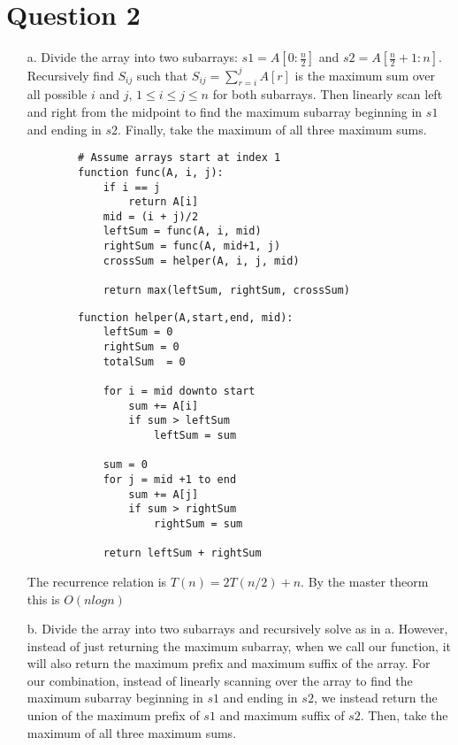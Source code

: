 \documentclass[12pt]{article}
\begin{document}
\section*{Question 2}
\begin{enumerate}
    \item[a.] Divide the array into two subarrays: $s1 = A[0:\frac{n}{2}]$ and $s2 = A[\frac{n}{2} + 1:n]$. Recursively find $S_{ij}$ such that $S_{ij} = \sum_{r=i}^j A[r]$ is the maximum sum over all possible $i$ and $j$, $1 \leq i \leq j \leq n$ for both subarrays. Then linearly scan left and right from the midpoint to find the maximum subarray beginning in $s1$ and ending in $s2$. Finally, take the maximum of all three maximum sums. 
    \begin{verbatim}
        # Assume arrays start at index 1
        function func(A, i, j):
            if i == j
                return A[i]
            mid = (i + j)/2
            leftSum = func(A, i, mid)
            rightSum = func(A, mid+1, j)
            crossSum = helper(A, i, j, mid)
        
            return max(leftSum, rightSum, crossSum)
    \end{verbatim}
    
    \begin{verbatim}
        function helper(A,start,end, mid):
            leftSum = 0
            rightSum = 0
            totalSum  = 0
        
            for i = mid downto start
                sum += A[i]
                if sum > leftSum
                    leftSum = sum
            
            sum = 0
            for j = mid +1 to end
                sum += A[j]
                if sum > rightSum
                    rightSum = sum
            
            return leftSum + rightSum
    \end{verbatim}
    
    The recurrence relation is $T(n) = 2T(n/2) + n$. By the master theorm this is $O(nlogn)$
    
    \item[b.] Divide the array into two subarrays and recursively solve as in a. However, instead of just returning the maximum subarray, when we call our function, it will also return the maximum prefix and maximum suffix of the array. For our combination, instead of linearly scanning over the array to find the maximum subarray beginning in $s1$ and ending in $s2$, we instead return the union of the maximum 
    prefix of $s1$ and maximum suffix of $s2$. Then, take the maximum of all three maximum sums.\\
    

\end{enumerate}
\end{document}
